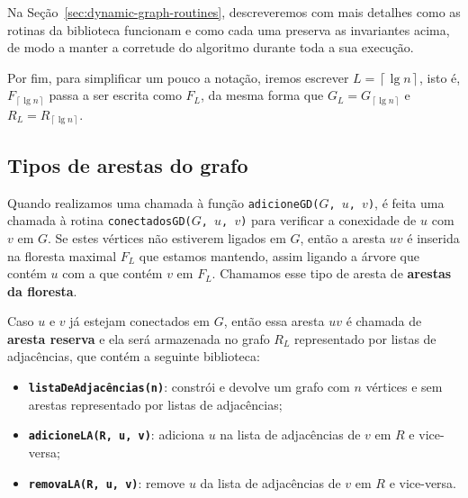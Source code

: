 Na Seção~\ref{sec:dynamic-graph-routines}, descreveremos com mais detalhes como as rotinas da biblioteca funcionam e como cada uma preserva as invariantes acima, de modo a manter a corretude do algoritmo durante toda a sua execução.

Por fim, para simplificar um pouco a notação, iremos escrever $L = \left\lceil \lg n \right\rceil$, isto é, $F_{\left\lceil \lg n \right\rceil}$ passa a ser escrita como $F_{L}$, da mesma forma que $G_L = G_{\left\lceil \lg n \right\rceil}$ e $R_L = R_{\left\lceil \lg n \right\rceil}$.

\subsection{Tipos de arestas do grafo}
\label{sec:dynamic-graph-edge-types}


Quando realizamos uma chamada à função \texttt{adicioneGD($G$, $u$, $v$)}, é feita uma chamada à rotina \texttt{conectadosGD($G$, $u$, $v$)} para verificar a conexidade de $u$ com $v$ em $G$. Se estes vértices não estiverem ligados em $G$, então a aresta $uv$ é inserida na floresta maximal $F_L$ que estamos mantendo, assim ligando a árvore que contém $u$ com a que contém $v$ em $F_L$. Chamamos esse tipo de aresta de \textbf{arestas da floresta}.

Caso $u$ e $v$ já estejam conectados em $G$, então essa aresta $uv$ é chamada de \textbf{aresta reserva} e ela será armazenada no grafo $R_L$ representado por listas de adjacências, que contém a seguinte biblioteca:

\begin{itemize}
    \item \texttt{\textbf{listaDeAdjacências(n)}}: constrói e devolve um grafo com $n$ vértices e sem arestas representado por listas de adjacências;
    \item \texttt{\textbf{adicioneLA(R, u, v)}}: adiciona $u$ na lista de adjacências de $v$ em $R$ e vice-versa;
    \item \texttt{\textbf{removaLA(R, u, v)}}: remove $u$ da lista de adjacências de $v$ em $R$ e vice-versa.
\end{itemize} 

